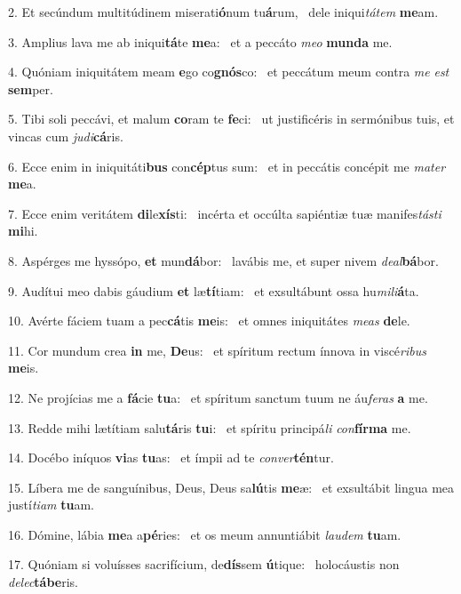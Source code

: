 2. Et secúndum multitúdinem miserati\textbf{ó}num tu\textbf{á}rum, \ast\  dele iniqui\textit{tá}\textit{tem} \textbf{me}am.\

3. Amplius lava me ab iniqui\textbf{tá}te \textbf{me}a: \ast\  et a peccáto \textit{me}\textit{o} \textbf{mun}\textbf{da} me.\

4. Quóniam iniquitátem meam \textbf{e}go co\textbf{gnós}co: \ast\  et peccátum meum contra \textit{me} \textit{est} \textbf{sem}per.\

5. Tibi soli peccávi, et malum \textbf{co}ram te \textbf{fe}ci: \ast\  ut justificéris in sermónibus tuis, et vincas cum \textit{ju}\textit{di}\textbf{cá}ris.\

6. Ecce enim in iniquitáti\textbf{bus} con\textbf{cép}tus sum: \ast\  et in peccátis concépit me \textit{ma}\textit{ter} \textbf{me}a.\

7. Ecce enim veritátem \textbf{di}le\textbf{xís}ti: \ast\  incérta et occúlta sapiéntiæ tuæ manifes\textit{tás}\textit{ti} \textbf{mi}hi.\

8. Aspérges me hyssópo, \textbf{et} mun\textbf{dá}bor: \ast\  lavábis me, et super nivem \textit{de}\textit{al}\textbf{bá}bor.\

9. Audítui meo dabis gáudium \textbf{et} læ\textbf{tí}tiam: \ast\  et exsultábunt ossa hu\textit{mi}\textit{li}\textbf{á}ta.\

10. Avérte fáciem tuam a pec\textbf{cá}tis \textbf{me}is: \ast\  et omnes iniquitátes \textit{me}\textit{as} \textbf{de}le.\

11. Cor mundum crea \textbf{in} me, \textbf{De}us: \ast\  et spíritum rectum ínnova in viscé\textit{ri}\textit{bus} \textbf{me}is.\

12. Ne projícias me a \textbf{fá}cie \textbf{tu}a: \ast\  et spíritum sanctum tuum ne áu\textit{fe}\textit{ras} \textbf{a} me.\

13. Redde mihi lætítiam salu\textbf{tá}ris \textbf{tu}i: \ast\  et spíritu principá\textit{li} \textit{con}\textbf{fír}\textbf{ma} me.\

14. Docébo iníquos \textbf{vi}as \textbf{tu}as: \ast\  et ímpii ad te \textit{con}\textit{ver}\textbf{tén}tur.\

15. Líbera me de sanguínibus, Deus, Deus sa\textbf{lú}tis \textbf{me}æ: \ast\  et exsultábit lingua mea justí\textit{ti}\textit{am} \textbf{tu}am.\

16. Dómine, lábia \textbf{me}a a\textbf{pé}ries: \ast\  et os meum annuntiábit \textit{lau}\textit{dem} \textbf{tu}am.\

17. Quóniam si voluísses sacrifícium, de\textbf{dís}sem \textbf{ú}tique: \ast\  holocáustis non \textit{de}\textit{lec}\textbf{tá}\textbf{be}ris.\

